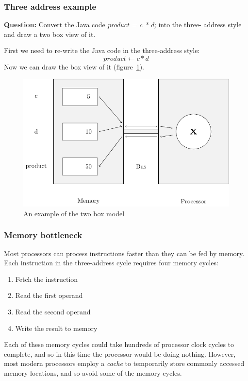 \subsubsection{Three address example}

{\bf Question:} Convert the Java code {\it product = c * d;} into the three-
address style and draw a two box view of it.

First we need to re-write the Java code in the three-address style:
\[
	product \leftarrow c * d
\]
Now we can draw the box view of it (figure~\ref{figure:two_box_model}).

\begin{figure}[ht!]
	\centering
	\includegraphics[width=\textwidth]{two_box_model_diagram.pdf}
	\caption{An example of the two box model}
	\label{figure:two_box_model}
\end{figure}

\subsubsection{Memory bottleneck}

Most processors can process instructions faster than they can be fed by memory.
Each instruction in the three-address cycle requires four memory cycles:

\begin{enumerate}
    \item Fetch the instruction
    \item Read the first operand
    \item Read the second operand
    \item Write the result to memory
\end{enumerate}

Each of these memory cycles could take hundreds of processor clock cycles to
complete, and so in this time the processor would be doing nothing. However,
most modern processors employ a {\it cache} to temporarily store commonly
accessed memory locations, and so avoid some of the memory cycles.

